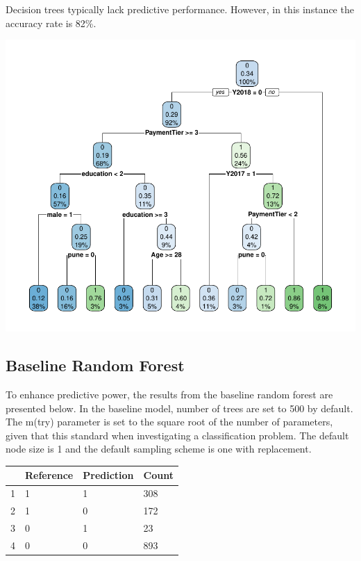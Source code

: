 \documentclass[11pt,preprint, authoryear]{elsarticle}
\let\origtable\table
\let\endorigtable\endtable
\renewenvironment{table}[1][2] {
    \expandafter\origtable\expandafter[H]
} {
    \endorigtable
}
\numberwithin{equation}{section}
\numberwithin{figure}{section}
\numberwithin{table}{section}
\begin{document}
Decision trees typically lack predictive performance. However, in this
instance the accuracy rate is 82\%.

\includegraphics{Final_project_files/figure-latex/unnamed-chunk-4-1.pdf}

\hypertarget{baseline-random-forest}{%
\subsection{Baseline Random Forest}\label{baseline-random-forest}}

To enhance predictive power, the results from the baseline random forest
are presented below. In the baseline model, number of trees are set to
500 by default. The m(try) parameter is set to the square root of the
number of parameters, given that this standard when investigating a
classification problem. The default node size is 1 and the default
sampling scheme is one with replacement.

\begin{table}[H]
\centering
\begin{tabular}{rlll}
  \hline
 & Reference & Prediction & Count \\ 
  \hline
1 & 1 & 1 & 308 \\ 
  2 & 1 & 0 & 172 \\ 
  3 & 0 & 1 &  23 \\ 
  4 & 0 & 0 & 893 \\ 
   \hline
\end{tabular}
\caption{Confusion Matrix for Baseline Random Forest \label{tab1}} 
\end{table}
\end{document}
